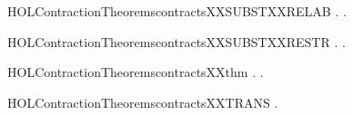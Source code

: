 \newcommand{\HOLContractionTheoremscontractsXXSUBSTXXPREFIX}{\UseVerbatim{HOLContractionTheoremscontractsXXSUBSTXXPREFIX}}
\begin{SaveVerbatim}{HOLContractionTheoremscontractsXXSUBSTXXRELAB}
\HOLTokenTurnstile{} \HOLSymConst{\HOLTokenForall{}} .    \HOLSymConst{\HOLTokenImp{}} \HOLSymConst{\HOLTokenForall{}}.       
\end{SaveVerbatim}
\newcommand{\HOLContractionTheoremscontractsXXSUBSTXXRELAB}{\UseVerbatim{HOLContractionTheoremscontractsXXSUBSTXXRELAB}}
\begin{SaveVerbatim}{HOLContractionTheoremscontractsXXSUBSTXXRESTR}
\HOLTokenTurnstile{} \HOLSymConst{\HOLTokenForall{}} .    \HOLSymConst{\HOLTokenImp{}} \HOLSymConst{\HOLTokenForall{}}.       
\end{SaveVerbatim}
\newcommand{\HOLContractionTheoremscontractsXXSUBSTXXRESTR}{\UseVerbatim{HOLContractionTheoremscontractsXXSUBSTXXRESTR}}
\begin{SaveVerbatim}{HOLContractionTheoremscontractsXXthm}
\HOLTokenTurnstile{} \HOLSymConst{\HOLTokenForall{}} .    \HOLSymConst{\HOLTokenEquiv{}} \HOLSymConst{\HOLTokenExists{}}.    \HOLSymConst{\HOLTokenConj{}}  
\end{SaveVerbatim}
\newcommand{\HOLContractionTheoremscontractsXXthm}{\UseVerbatim{HOLContractionTheoremscontractsXXthm}}
\begin{SaveVerbatim}{HOLContractionTheoremscontractsXXTRANS}
\HOLTokenTurnstile{} \HOLSymConst{\HOLTokenForall{}}  .    \HOLSymConst{\HOLTokenConj{}}    \HOLSymConst{\HOLTokenImp{}}   
\end{SaveVerbatim}
\newcommand{\HOLContractionTheoremscontractsXXTRANS}{\UseVerbatim{HOLContractionTheoremscontractsXXTRANS}}
